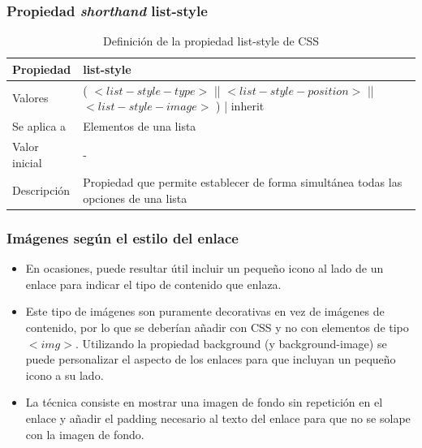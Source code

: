 \begin{frame}
\frametitle{Propiedad \emph{shorthand} list-style}

\begin{center}
  \begin{table}
   \begin{tabular}{p{1.8cm}p{7.8cm}}
Propiedad & \bf{list-style} \\ \hline
Valores& ( $<list-style-type>$ || $<list-style-position>$ || $<list-style-image>$ ) | inherit \\ \hline
Se aplica a& Elementos de una lista \\ \hline
Valor inicial& - \\ \hline
Descripción& Propiedad que permite establecer de forma simultánea todas las opciones de una lista \\ \hline
  \end{tabular}
   \caption{Definición de la propiedad list-style de CSS}
 \end{table}
\end{center}


\end{frame}



\begin{frame}
\frametitle{Imágenes según el estilo del enlace}

\begin{itemize}
  \item En ocasiones, puede resultar útil incluir un pequeño icono al lado de un enlace para indicar el tipo de contenido que enlaza.
  \item Este tipo de imágenes son puramente decorativas en vez de imágenes de contenido, por lo que se deberían añadir con CSS y no con elementos de tipo $<img>$. Utilizando la propiedad background (y background-image) se puede personalizar el aspecto de los enlaces para que incluyan un pequeño icono a su lado.
  \item La técnica consiste en mostrar una imagen de fondo sin repetición en el enlace y añadir el padding necesario al texto del enlace para que no se solape con la imagen de fondo.
\end{itemize}

\end{frame}



